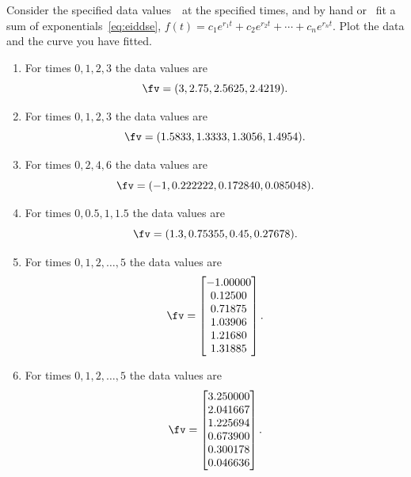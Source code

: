 \begin{exercise} \label{eg:}
Consider the specified data values~\fv\ at the specified times, and by hand or \script\ fit a sum of exponentials~\eqref{eq:eiddse}, \(f(t)=c_1e^{r_1t}+c_2e^{r_2t}+\cdots+c_ne^{r_nt}\).
Plot the data and the curve you have fitted.
\begin{enumerate}
\item For times \(0,1,2,3\) the data values are \[\fv=(3, 2.75, 2.5625, 2.4219).\]
\item For times \(0,1,2,3\) the data values are \[\fv=(1.5833, 1.3333, 1.3056, 1.4954).\]
\item For times \(0,2,4,6\) the data values are \[\fv=(-1, 0.222222, 0.172840, 0.085048).\]
\item For times \(0,0.5,1,1.5\) the data values are \[\fv=(1.3, 0.75355, 0.45, 0.27678).\]

\item For times \(0,1,2,\ldots,5\) the data values are 
\setbox\ajrqrbox\hbox{}\marginpar{\usebox{\ajrqrbox}}%
\[ \fv=\begin{bmatrix} -1.00000
\\ 0.12500
\\ 0.71875
\\ 1.03906
\\ 1.21680
\\ 1.31885 \end{bmatrix}.\]
  
\item For times \(0,1,2,\ldots,5\) the data values are 
\setbox\ajrqrbox\hbox{}\marginpar{\usebox{\ajrqrbox}}%
\[ \fv=\begin{bmatrix} 3.250000
\\ 2.041667
\\ 1.225694
\\ 0.673900
\\ 0.300178
\\ 0.046636 \end{bmatrix}.\]
  

\end{enumerate}
\end{exercise}
